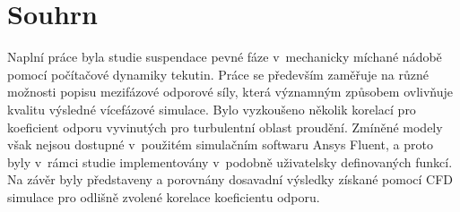 \section*{Souhrn}
\vspace{3mm}
Naplní práce byla studie suspendace pevné fáze v~mechanicky míchané nádobě pomocí počítačové dynamiky tekutin. Práce se především zaměřuje na různé možnosti popisu mezifázové odporové síly, která významným způsobem ovlivňuje kvalitu výsledné vícefázové simulace. Bylo vyzkoušeno několik korelací pro koeficient odporu vyvinutých pro turbulentní oblast proudění. Zmíněné modely však nejsou dostupné v~použitém simulačním softwaru Ansys Fluent, a proto byly v~rámci studie implementovány v~podobně uživatelsky definovaných funkcí. Na závěr byly představeny a porovnány dosavadní výsledky získané pomocí CFD simulace pro odlišně zvolené korelace koeficientu odporu.
